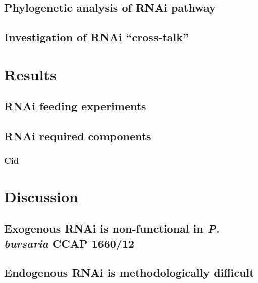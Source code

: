 \subsection{Phylogenetic analysis of RNAi pathway}


\subsection{Investigation of RNAi ``cross-talk''}


\section{Results}

\subsection{RNAi feeding experiments}




\subsection{RNAi required components}

\subsubsection{Cid}






\section{Discussion}

\subsection{Exogenous RNAi is non-functional in \textit{P. bursaria} CCAP 1660/12}



\subsection{Endogenous RNAi is methodologically difficult}


